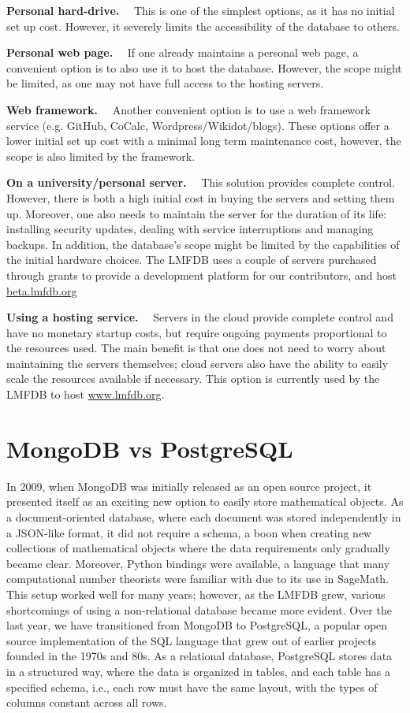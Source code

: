 \documentclass{amsart}
\newcommand{\subhead}[1]{\vspace{0.1in} \noindent \textbf{#1.}\ \ }
\begin{document}
\subhead{Personal hard-drive}
    This is one of the simplest options, as it has no initial set up cost.
    However, it severely limits the accessibility of the database to others.

\subhead{Personal web page}
    If one already maintains a personal web page, a convenient option is to also use it to host the database.
    However, the scope might be limited, as one may not have full access to the hosting servers.

\subhead{Web framework}
    Another convenient option is to use a web framework service (e.g. GitHub, CoCalc, Wordpress/Wikidot/blogs).
    These options offer a lower initial set up cost with a minimal long term maintenance cost, however, the scope is also limited by the framework.

\subhead{On a university/personal server}
    This solution provides complete control.
    However, there is both a high initial cost in buying the servers and setting them up.  Moreover, one also needs to maintain the server for the duration of its life: installing security updates, dealing with service interruptions and managing backups.
    In addition, the database's scope might be limited by the capabilities of the initial hardware choices.
    The LMFDB uses a couple of servers purchased through grants to provide a development platform for our contributors, and host \url{beta.lmfdb.org}

\subhead{Using a hosting service}
Servers in the cloud \cites{aws, gcp} provide complete control and have no monetary startup costs, but require ongoing payments proportional to the resources used.
    The main benefit is that one does not need to worry about maintaining the servers themselves; cloud servers also have the ability to easily scale the resources available if necessary.
    This option is currently used by the LMFDB to host \url{www.lmfdb.org}.


\section{MongoDB vs PostgreSQL}
\label{sec:MvsP}

In 2009, when MongoDB was initially released as an open source project, it presented itself as an exciting new option to easily store mathematical objects.
As a document-oriented database, where each document was stored independently in a JSON-like format, it did not require a schema, a boon when creating new collections of mathematical objects where the data requirements only gradually became clear.
Moreover, Python bindings were available, a language that many computational number theorists were familiar with due to its use in SageMath.
This setup worked well for many years; however, as the LMFDB grew, various shortcomings of using a non-relational database became more evident.
Over the last year, we have transitioned from MongoDB to PostgreSQL, a popular open source implementation of the SQL language that grew out of earlier projects founded in the 1970s and 80s.
As a relational database, PostgreSQL stores data in a structured way, where the data is organized in tables, and each table has a specified schema, i.e., each row must have the same layout, with the types of columns constant across all rows.
\end{document}
